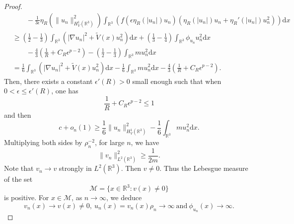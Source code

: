 \documentclass[10pt,a4paper]{amsart}
\begin{document}
\begin{proof}
\begin{equation*}
\begin{split}
        &\quad\quad-\frac{1}{3\epsilon}\eta _{R}\left ( \|u_n\|^{2}_{H^1_{V}(\mathbb{R}^3)} \right )\int_{\mathbb{R}^{3}}\left(f\left (\epsilon \eta _{R}\left ( \left | u_n\right | \right ) u_n\right )\left (\eta _{R}\left ( \left | u_n\right | \right ) u_n +\eta _{R}'\left ( \left | u_n\right |\right )u_n^2 \right )\right)\text{d}x\\
		&\geq\left(\frac{1}{2}-\frac{1}{3}\right)\int_{\mathbb R^3}\left(|\nabla u_n|^2+\tilde V(x)u_n^2\right)\text{d}x+\left(\frac{1}{3}-\frac{1}{4}\right)\int_{\mathbb R^3}\phi_{u_n}u_n^2\text{d}x\\
		&\quad\quad-\frac{4}{3}\left(\frac{1}{R}+C_{R}\epsilon ^{p-2}\right)-\left(\frac{1}{2}-\frac{1}{3}\right)\int_{\mathbb{R}^3}m u^{2}_n\text{d}x\\
		&=\frac{1}{6}\int_{\mathbb R^3}\left(|\nabla u_n|^2+\tilde V(x)u_n^2\right)\text{d}x-\frac{1}{6}\int_{\mathbb{R}^3}m u^{2}_n\text{d}x-\frac{4}{3}\left(\frac{1}{R}+C_{R}\epsilon ^{p-2}\right).
	\end{split}\end{equation*}
Then, there exists a constant $\epsilon'(R)>0$ small enough such that when   $0<\epsilon\leq\epsilon'(R)$, one has
$$\frac{1}{R}+C_{R}\epsilon ^{p-2}\leq1 $$
and then
\begin{equation*}
	c+o_{n}(1)\geq \frac{1}{6}\|u_n\|^{2}_{H^{1}_{V}(\mathbb R^3)}- \frac{1}{6}\int_{\mathbb{R}^3}m u^{2}_n\text{d}x.
	\end{equation*}
Multiplying both sides by $\rho_{n}^{-2}$, for large $n$, we have 	
	$$\|v_n\|_{L^{2}(\mathbb{R}^3)}^{2}\geq \frac{1}{2m}.$$
Note that $v_n\to v$ strongly in $L^{2}(\mathbb{R}^3)$. Then $v\neq0$. Thus the Lebesgue measure of the set
$$\mathcal{M}=\{x\in\mathbb{R}^3:v(x)\neq 0\}$$
is positive. For $x\in\mathcal{M}$, as $n\to\infty$, we deduce
$$v_n(x)\to v(x)\neq 0,~u_{n}(x)=v_{n}(x)\rho_n\to\infty~\text{and}~\phi_{u_n}(x)\to\infty.$$


\end{proof}
\end{document}
